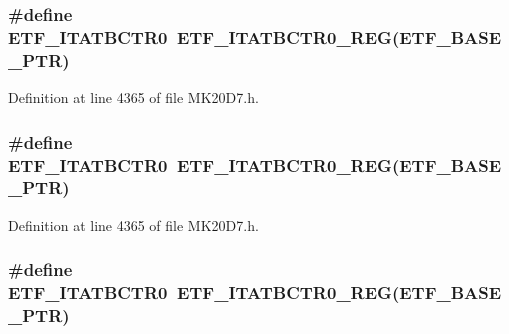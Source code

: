 \subsubsection[{\texorpdfstring{E\+T\+F\+\_\+\+I\+T\+A\+T\+B\+C\+T\+R0}{ETF_ITATBCTR0}}]{\setlength{\rightskip}{0pt plus 5cm}\#define E\+T\+F\+\_\+\+I\+T\+A\+T\+B\+C\+T\+R0~{\bf E\+T\+F\+\_\+\+I\+T\+A\+T\+B\+C\+T\+R0\+\_\+\+R\+EG}({\bf E\+T\+F\+\_\+\+B\+A\+S\+E\+\_\+\+P\+TR})}\hypertarget{group___e_t_f___register___accessor___macros_gad9fb17ae8ec9910d7115cefd293144ac}{}\label{group___e_t_f___register___accessor___macros_gad9fb17ae8ec9910d7115cefd293144ac}


Definition at line 4365 of file M\+K20\+D7.\+h.

\subsubsection[{\texorpdfstring{E\+T\+F\+\_\+\+I\+T\+A\+T\+B\+C\+T\+R0}{ETF_ITATBCTR0}}]{\setlength{\rightskip}{0pt plus 5cm}\#define E\+T\+F\+\_\+\+I\+T\+A\+T\+B\+C\+T\+R0~{\bf E\+T\+F\+\_\+\+I\+T\+A\+T\+B\+C\+T\+R0\+\_\+\+R\+EG}({\bf E\+T\+F\+\_\+\+B\+A\+S\+E\+\_\+\+P\+TR})}\hypertarget{group___e_t_f___register___accessor___macros_gad9fb17ae8ec9910d7115cefd293144ac}{}\label{group___e_t_f___register___accessor___macros_gad9fb17ae8ec9910d7115cefd293144ac}


Definition at line 4365 of file M\+K20\+D7.\+h.

\subsubsection[{\texorpdfstring{E\+T\+F\+\_\+\+I\+T\+A\+T\+B\+C\+T\+R0}{ETF_ITATBCTR0}}]{\setlength{\rightskip}{0pt plus 5cm}\#define E\+T\+F\+\_\+\+I\+T\+A\+T\+B\+C\+T\+R0~{\bf E\+T\+F\+\_\+\+I\+T\+A\+T\+B\+C\+T\+R0\+\_\+\+R\+EG}({\bf E\+T\+F\+\_\+\+B\+A\+S\+E\+\_\+\+P\+TR})}\hypertarget{group___e_t_f___register___accessor___macros_gad9fb17ae8ec9910d7115cefd293144ac}{}\label{group___e_t_f___register___accessor___macros_gad9fb17ae8ec9910d7115cefd293144ac}


